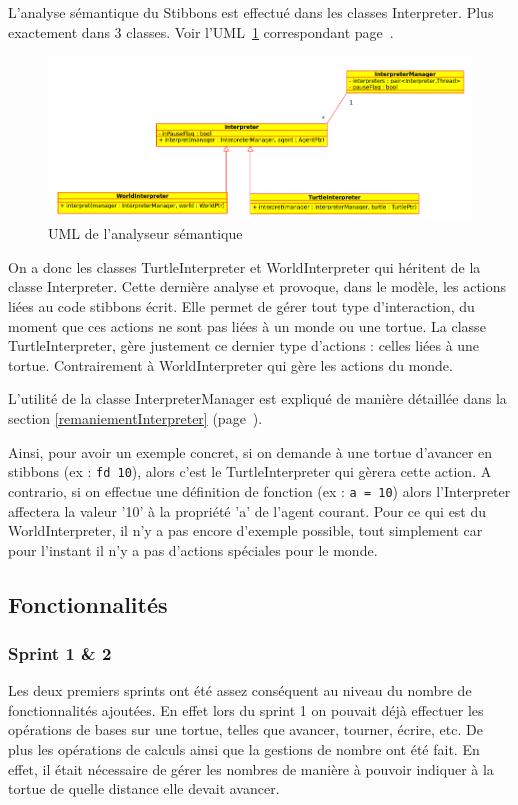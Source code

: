 L'analyse sémantique du Stibbons est effectué dans les classes Interpreter. Plus exactement dans 3 classes. Voir l'UML~\ref{interpreterUML} correspondant page~\pageref{interpreterUML}.

\begin{figure}[h]
\caption{\label{interpreterUML} UML de l'analyseur sémantique}
\includegraphics[scale=0.5]{doc/report/uml/interpreterUML.png}
\end{figure}

On a donc les classes TurtleInterpreter et WorldInterpreter qui héritent de la classe Interpreter. Cette dernière analyse et provoque, dans le modèle, les actions liées au code stibbons écrit. Elle permet de gérer tout type d'interaction, du moment que ces actions ne sont pas liées à un monde ou une tortue. La classe TurtleInterpreter, gère justement ce dernier type d'actions : celles liées à une tortue. Contrairement à WorldInterpreter qui gère les actions du monde.

L'utilité de la classe InterpreterManager est expliqué de manière détaillée dans la section \ref{remaniementInterpreter} (page~\pageref{remaniementInterpreter}).

Ainsi, pour avoir un exemple concret, si on demande à une tortue d'avancer en stibbons (ex : \verb|fd 10|), alors c'est le TurtleInterpreter qui gèrera cette action.
A contrario, si on effectue une définition de fonction (ex : \verb|a = 10|) alors l'Interpreter affectera la valeur '10' à la propriété 'a' de l'agent courant.
Pour ce qui est du WorldInterpreter, il n'y a pas encore d'exemple possible, tout simplement car pour l'instant il n'y a pas d'actions spéciales pour le monde.

\subsection{Fonctionnalités}

\subsubsection{Sprint 1 \& 2}
Les deux premiers sprints ont été assez conséquent au niveau du nombre de fonctionnalités ajoutées.
En effet lors du sprint 1 on pouvait déjà effectuer les opérations de bases sur une tortue, telles que avancer, tourner, écrire, etc. De plus les opérations de calculs ainsi que la gestions de nombre ont été fait. En effet, il était nécessaire de gérer les nombres de manière à pouvoir indiquer à la tortue de quelle distance elle devait avancer.

